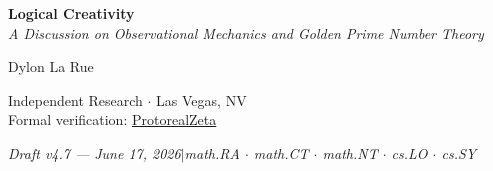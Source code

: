 

\begin{center}
\vspace*{0.5em}
{\LARGE\bfseries Logical Creativity}\\[12pt]
{\large\itshape A Discussion on Observational Mechanics and Golden Prime Number Theory}

\vspace{1.5em}
{\large Dylon La Rue}

\vspace{0.5em}
{\small Independent Research $\cdot$ Las Vegas, NV\\
Formal verification: \href{https://github.com/Dielawn-01/ProtorealZeta}{ProtorealZeta}}

\vspace{0.5em}
{\small\itshape Draft v4.7 --- June 17, 2026\quad$|$\quad math.RA $\cdot$ math.CT $\cdot$ math.NT $\cdot$ cs.LO $\cdot$ cs.SY}
\end{center}

\vspace{1em}

